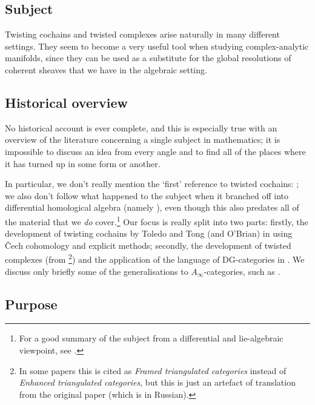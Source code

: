 \documentclass[11pt,notitlepage]{article}
\numberwithin{equation}{subsection}
\begin{document}
            \subsection{Subject}

                Twisting cochains and twisted complexes arise naturally in many different settings.
                They seem to become a very useful tool when studying complex-analytic manifolds, since they can be used as a substitute for the global resolutions of coherent sheaves that we have in the algebraic setting.

            \subsection{Historical overview}

                No historical account is ever complete, and this is especially true with an overview of the literature concerning a single subject in mathematics; it is impossible to discuss an idea from every angle and to find all of the places where it has turned up in some form or another.

                In particular, we don't really mention the `first' reference to twisted cochains: \cite{Brown:1959ia}; we also don't follow what happened to the subject when it branched off into differential homological algebra (namely \cite{Moore:70dh}), even though this also predates all of the material that we \textit{do} cover.\footnote{For a good summary of the subject from a differential and lie-algebraic viewpoint, see \cite{Stasheff:2009cc}.}
                Our focus is really split into two parts: firstly, the development of twisting cochains by Toledo and Tong (and O'Brian) in \cite{Toledo:1976gy,Toledo:1978tq,OBrian:1981vs} using Čech cohomology and explicit methods; secondly, the development of twisted complexes (from \cite{Bondal:1991un}\footnote{In some papers this is cited as \textit{Framed triangulated categories} instead of \textit{Enhanced triangulated categories}, but this is just an artefact of translation from the original paper (which is in Russian).}) and the application of the language of DG-categories in \cite{Block:2015vk,Wei:2016tv,Wei:2016ip}.
                We discuss only briefly some of the generalisations to $A_\infty$-categories, such as \cite{Faonte:2015vc}.

            \subsection{Purpose}
\end{document}
